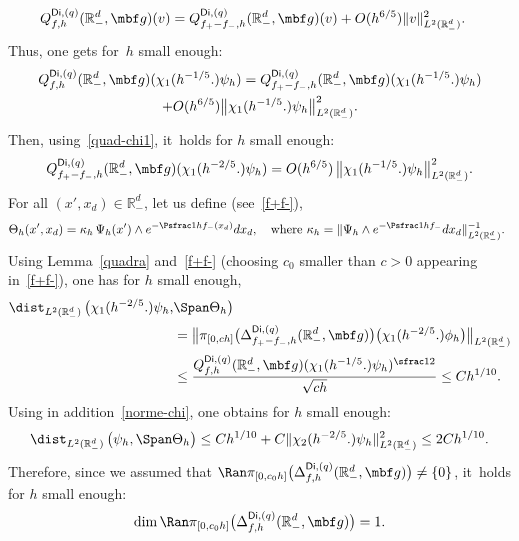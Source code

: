 \begin{align}
\label{eq.=forme}
Q_{f,h}^{\mathsf{Di},(q)}(\mathbb R^d_-, { \mbf g}) (v)&=Q_{f_+-f_-,h}^{\mathsf{Di},(q)}(\mathbb R^d_-, { \mbf g}) (v) + O(h^{6/5}) \Vert v \Vert_{L^2(\mathbb R^d_-)}^2.
\end{align}
Thus, one gets for~$h$ small enough:
\begin{multline*}
Q_{f,h}^{\mathsf{Di},(q)}(\mathbb R^d_-, { \mbf g}) (\chi_1(h^{-1/5 }.) \psi_h)=Q_{f_+-f_-,h}^{\mathsf{Di},(q)}(\mathbb R^d_-, { \mbf g}) (\chi_1(h^{-1/5 }.) \psi_h) \\
+ O(h^{ 6/5}) \big \Vert \chi_1(h^{-1/5 }.) \psi_h \big \Vert_{L^2(\mathbb R^d_-)}^2.
\end{multline*}
Then, using~\eqref{quad-chi1}, it~holds for $h$ small enough:
\[
Q_{f_+-f_-,h}^{\mathsf{Di},(q)}(\mathbb R^d_-, { \mbf g}) (\chi_1(h^{-2/5 }.) \psi_h)=O(h^{6/5})\, \big\Vert \chi_1(h^{-1/5 }.) \psi_h \big\Vert_{L^2(\mathbb R_-^d)}^2.
\]
For all $(x',x_d)\in \mathbb R^d_-$, let us define (see~\eqref{f+f-}),
\[
\Theta_h(x',x_d)=\kappa_h\, \Psi_h(x')\wedge e^{-\Psfrac 1h f_-(x_d)}dx_d, \quad\text{where $\kappa_h= \Vert \Psi_h\wedge e^{-\Psfrac 1h f_-}dx_d\Vert_{L^2(\mathbb R^d_-)}^{-1}$. }
\]
Using Lemma~\ref{quadra} and~\eqref{f+f-} (choosing $c_0$ smaller than $c>0$ appearing in~\eqref{f+f-}), one has for $h$ small enough,
\begin{align*}
\dist_{L^2(\mathbb R_-^d)}\, \bigl(\chi_1(h^{-2/5 }.) \psi_h,&\Span \Theta_h\bigr)\\
&=\big \Vert \pi_{[0,ch]}\bigl(\Delta_{f_+-f_-,h}^{\mathsf{Di},(q)}(\mathbb R_-^d, { \mbf g})\bigr)\bigl(\chi_1(h^{-2/5 }.)\phi_h \bigr)\big \Vert_{L^2(\mathbb R^d_-)}\\
&\le \frac{ Q_{f,h}^{\mathsf{Di},(q)}(\mathbb R^d_-, { \mbf g}) (\chi_1(h^{-1/5 }.) \psi_h)^{\sfrac12}}{\sqrt{ch}} \le Ch^{{1}/{10}}.
\end{align*}
Using in addition~\eqref{norme-chi}, one obtains for $h$ small enough:
\[
\dist_{L^2(\mathbb R_-^d)}\, \bigl(\psi_h,\Span \Theta_h\bigr)\le Ch^{ {1}/{10}} + C \Vert \chi_2(h^{-2/5 }.) \psi_h \Vert_{L^2(\mathbb R_-^d)}^2 \le 2Ch^{ {1}/{10}}.
\]
Therefore, since we assumed that $\Ran \pi _{[0,c_0h]}\bigl(\Delta_{f,h}^{\mathsf{Di},(q)}(\mathbb R_-^d, \mbf g) \bigr) \neq \{0\}$, it~holds for $h$ small enough:
\[
\dim \Ran \pi_{[0,c_0h]}\bigl(\Delta_{f,h}^{\mathsf{Di},(q)}(\mathbb R_-^d, \mbf g)\bigr)=1.
\]

